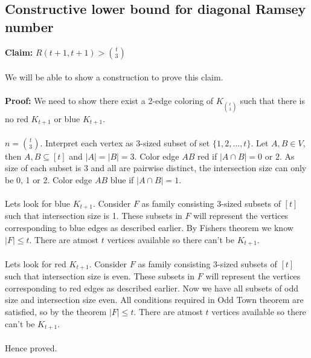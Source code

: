 \subsection{Constructive lower bound for diagonal Ramsey number}
\textbf{Claim:} $R(t+1,t+1)> {t\choose 3}$\\\\
We will be able to show a construction to prove this claim.\\\\
\textbf{Proof:} We need to show there exist a 2-edge coloring of $K_{t\choose 3}$ such that there is no red $K_{t+1}$ or blue $K_{t+1}$.\\\\
$n={t\choose 3}$. Interpret each vertex as 3-sized subset of set $\{1, 2, \hdots, t\}$. Let $A,B \in V$, then $A,B \subseteq [t]$ and $|A|=|B|=3$. Color edge $AB$ red if $|A\cap B| =0$ or $2$. As size of each subset is 3 and all are pairwise distinct, the intersection size can only be 0, 1 or 2. Color edge $AB$ blue if $|A\cap B| =1$.\\\\
Lets look for blue $K_{t+1}$. Consider $F$ as family consisting 3-sized subsets of $[t]$ such that intersection size is 1. These subsets in $F$ will represent the vertices corresponding to blue edges as described earlier. By Fishers theorem we know $|F|\le t$. There are atmost $t$ vertices available so there can't be $K_{t+1}$.\\\\
Lets look for red $K_{t+1}$. Consider $F$ as family consisting 3-sized subsets of $[t]$ such that intersection size is even. These subsets in $F$ will represent the vertices corresponding to red edges as described earlier. Now we have all subsets of odd size and intersection size even. All conditions required in Odd Town theorem are satisfied, so by the theorem $|F|\le t$. There are atmost $t$ vertices available so there can't be $K_{t+1}$.\\\\
Hence proved.

